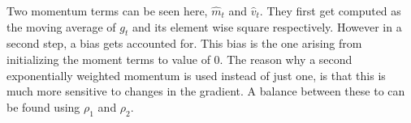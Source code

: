 \noindent 
Two momentum terms can be seen here, $\hat{m}_t$ and $\hat{v}_t$. They first get computed as the moving average of $g_t$ and its element wise square respectively. However in a second step, a bias gets accounted for. This bias is the one arising from initializing the moment terms to value of 0. The reason why a second exponentially weighted momentum is used instead of just one, is that this is much more sensitive to changes in the gradient. A balance between these to can be found using $\rho_1$ and $\rho_2$.
